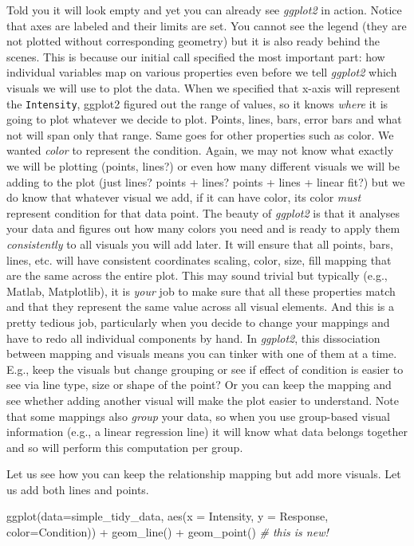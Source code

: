 \documentclass[
]{book}
\newenvironment{Shaded}{\begin{snugshade}}{\end{snugshade}}
\newcommand{\AttributeTok}[1]{\textcolor[rgb]{0.77,0.63,0.00}{#1}}
\newcommand{\CommentTok}[1]{\textcolor[rgb]{0.56,0.35,0.01}{\textit{#1}}}
\newcommand{\FunctionTok}[1]{\textcolor[rgb]{0.00,0.00,0.00}{#1}}
\newcommand{\NormalTok}[1]{#1}
\newcommand{\SpecialCharTok}[1]{\textcolor[rgb]{0.00,0.00,0.00}{#1}}
\begin{document}
Told you it will look empty and yet you can already see \emph{ggplot2} in action. Notice that axes are labeled and their limits are set. You cannot see the legend (they are not plotted without corresponding geometry) but it is also ready behind the scenes. This is because our initial call specified the most important part: how individual variables map on various properties even before we tell \emph{ggplot2} which visuals we will use to plot the data. When we specified that x-axis will represent the \texttt{Intensity}, ggplot2 figured out the range of values, so it knows \emph{where} it is going to plot whatever we decide to plot. Points, lines, bars, error bars and what not will span only that range. Same goes for other properties such as color. We wanted \emph{color} to represent the condition. Again, we may not know what exactly we will be plotting (points, lines?) or even how many different visuals we will be adding to the plot (just lines? points + lines? points + lines + linear fit?) but we do know that whatever visual we add, if it can have color, its color \emph{must} represent condition for that data point. The beauty of \emph{ggplot2} is that it analyses your data and figures out how many colors you need and is ready to apply them \emph{consistently} to all visuals you will add later. It will ensure that all points, bars, lines, etc. will have consistent coordinates scaling, color, size, fill mapping that are the same across the entire plot. This may sound trivial but typically (e.g., Matlab, Matplotlib), it is \emph{your} job to make sure that all these properties match and that they represent the same value across all visual elements. And this is a pretty tedious job, particularly when you decide to change your mappings and have to redo all individual components by hand. In \emph{ggplot2}, this dissociation between mapping and visuals means you can tinker with one of them at a time. E.g., keep the visuals but change grouping or see if effect of condition is easier to see via line type, size or shape of the point? Or you can keep the mapping and see whether adding another visual will make the plot easier to understand. Note that some mappings also \emph{group} your data, so when you use group-based visual information (e.g., a linear regression line) it will know what data belongs together and so will perform this computation per group.

Let us see how you can keep the relationship mapping but add more visuals. Let us add both lines and points.

\begin{Shaded}
\begin{Highlighting}[]
\FunctionTok{ggplot}\NormalTok{(}\AttributeTok{data=}\NormalTok{simple\_tidy\_data, }\FunctionTok{aes}\NormalTok{(}\AttributeTok{x =}\NormalTok{ Intensity, }\AttributeTok{y =}\NormalTok{ Response, }\AttributeTok{color=}\NormalTok{Condition)) }\SpecialCharTok{+} 
  \FunctionTok{geom\_line}\NormalTok{() }\SpecialCharTok{+}
  \FunctionTok{geom\_point}\NormalTok{() }\CommentTok{\# this is new!}
\end{Highlighting}
\end{Shaded}
\end{document}
